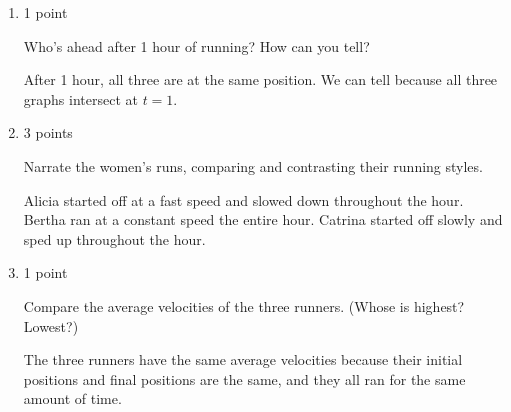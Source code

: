 \documentclass{article}
\begin{document}
\begin{enumerate}
  \begin{enumerate}[start=2]

  \item

    \begin{grading}
      1 point
    \end{grading}

    \begin{problem}[\vfill]
      Who's ahead after 1 hour of running?  How can you tell?
    \end{problem}

    \begin{solution}
      After 1 hour, all three are at the same position. We can tell because all
      three graphs intersect at $t=1$. 
    \end{solution}

  \item

    \begin{grading}
      3 points
    \end{grading}

    \begin{problem}[\stretch{3}]
      Narrate the women's runs, comparing and contrasting their running styles. 
    \end{problem}

    \begin{solution}
      Alicia started off at a fast speed and slowed down throughout the hour. Bertha ran at a constant
      speed the entire hour. Catrina started off slowly and sped up throughout the hour.
    \end{solution}

  \item

    \begin{grading}
      1 point
    \end{grading}

    \begin{problem}[\vfill\newpage]
      Compare the average velocities of the three runners. (Whose is highest? Lowest?) 
    \end{problem}

    \begin{solution}
      The three runners have the same average velocities because their initial positions and final positions are the same,
      and they all ran for the same amount of time.
    \end{solution}


\end{enumerate}
\end{enumerate}
\end{document}
